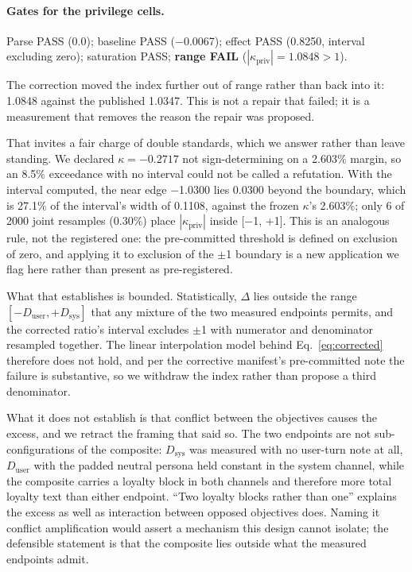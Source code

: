 \documentclass{article}
\providecommand{\textminus}{\ensuremath{-}}
\begin{document}
\paragraph{Gates for the privilege cells.} Parse PASS (0.0); baseline PASS (\textminus 0.0067); effect PASS
  (0.8250, interval excluding zero); saturation PASS;
  \textbf{range FAIL} ($|\kappa_{\text{priv}}| = 1.0848 > 1$).

The correction moved the index further out of range rather than back into it:
1.0848 against the published 1.0347. This is not a repair that failed; it is
a measurement that removes the reason the repair was proposed.

That invites a fair charge of double standards, which we answer rather than
leave standing. We declared $\kappa = -0.2717$ not sign-determining on a
2.603\% margin, so an 8.5\% exceedance with no interval could not be called a
refutation. With the interval computed, the near edge \textminus 1.0300 lies 0.0300
beyond the boundary, which is 27.1\% of the interval's width of 0.1108,
against the frozen $\kappa$'s 2.603\%; only 6 of 2000 joint resamples
(0.30\%) place $|\kappa_{\text{priv}}|$ inside [\textminus 1, +1]. This is an
analogous rule, not the registered one: the pre-committed threshold is defined
on exclusion of zero, and applying it to exclusion of the $\pm$1 boundary is a
new application we flag here rather than present as pre-registered.

What that establishes is bounded. Statistically, $\Delta$ lies outside the range
$[-D_{\text{user}}, +D_{\text{sys}}]$ that any mixture of the two measured
endpoints permits, and the corrected ratio's interval excludes $\pm$1 with
numerator and denominator resampled together. The linear interpolation model
behind Eq.~\ref{eq:corrected} therefore does not hold, and per the corrective
manifest's pre-committed note the failure is substantive, so we withdraw the
index rather than propose a third denominator.

What it does not establish is that conflict between the objectives causes the
excess, and we retract the framing that said so. The two endpoints are not
sub-configurations of the composite: $D_{\text{sys}}$ was measured with no
user-turn note at all, $D_{\text{user}}$ with the padded neutral persona held
constant in the system channel, while the composite carries a loyalty block in
both channels and therefore more total loyalty text than either endpoint. ``Two
loyalty blocks rather than one'' explains the excess as well as interaction
between opposed objectives does. Naming it conflict amplification would assert a
mechanism this design cannot isolate; the defensible statement is that the
composite lies outside what the measured endpoints admit.
\end{document}
